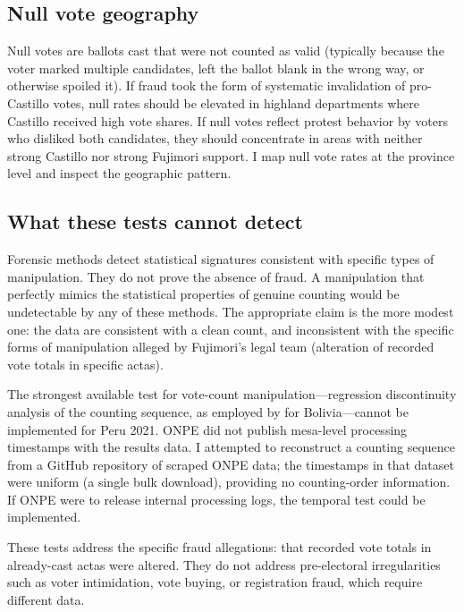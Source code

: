 \documentclass[12pt]{article}
\begin{document}
\subsection{Null vote geography}

Null votes are ballots cast that were not counted as valid (typically because
the voter marked multiple candidates, left the ballot blank in the wrong way,
or otherwise spoiled it). If fraud took the form of systematic invalidation of
pro-Castillo votes, null rates should be elevated in highland departments where
Castillo received high vote shares. If null votes reflect protest behavior by
voters who disliked both candidates, they should concentrate in areas with
neither strong Castillo nor strong Fujimori support. I map null vote rates at
the province level and inspect the geographic pattern.

\subsection{What these tests cannot detect}

Forensic methods detect statistical signatures consistent with specific types of
manipulation. They do not prove the absence of fraud. A manipulation that
perfectly mimics the statistical properties of genuine counting would be
undetectable by any of these methods. The appropriate claim is the more modest
one: the data are consistent with a clean count, and inconsistent with the
specific forms of manipulation alleged by Fujimori's legal team (alteration of
recorded vote totals in specific actas).

The strongest available test for vote-count manipulation---regression
discontinuity analysis of the counting sequence, as employed by
\citet{escobari2024} for Bolivia---cannot be implemented for Peru 2021. ONPE
did not publish mesa-level processing timestamps with the results data. I
attempted to reconstruct a counting sequence from a GitHub repository of
scraped ONPE data; the timestamps in that dataset were uniform (a single bulk
download), providing no counting-order information. If ONPE were to release
internal processing logs, the temporal test could be implemented.

These tests address the specific fraud allegations: that recorded vote totals
in already-cast actas were altered. They do not address pre-electoral
irregularities such as voter intimidation, vote buying, or registration fraud,
which require different data.

\end{document}
